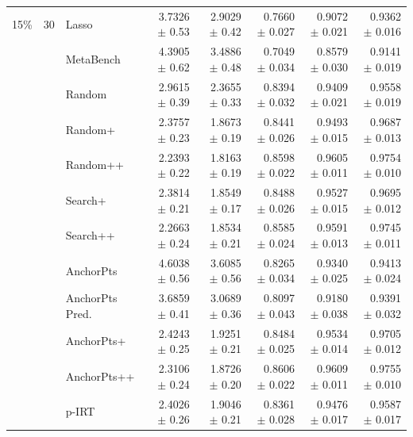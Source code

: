 \begin{longtable}{llp{}rrrrr}
\midrule
15\% & 30 & Lasso & 3.7326 {\scriptsize $\pm$ 0.53} & 2.9029 {\scriptsize $\pm$ 0.42} & 0.7660 {\scriptsize $\pm$ 0.027} & 0.9072 {\scriptsize $\pm$ 0.021} & 0.9362 {\scriptsize $\pm$ 0.016} \\
 &  & MetaBench & 4.3905 {\scriptsize $\pm$ 0.62} & 3.4886 {\scriptsize $\pm$ 0.48} & 0.7049 {\scriptsize $\pm$ 0.034} & 0.8579 {\scriptsize $\pm$ 0.030} & 0.9141 {\scriptsize $\pm$ 0.019} \\
 &  & Random & 2.9615 {\scriptsize $\pm$ 0.39} & 2.3655 {\scriptsize $\pm$ 0.33} & 0.8394 {\scriptsize $\pm$ 0.032} & 0.9409 {\scriptsize $\pm$ 0.021} & 0.9558 {\scriptsize $\pm$ 0.019} \\
 &  & Random+ & 2.3757 {\scriptsize $\pm$ 0.23} & 1.8673 {\scriptsize $\pm$ 0.19} & 0.8441 {\scriptsize $\pm$ 0.026} & 0.9493 {\scriptsize $\pm$ 0.015} & 0.9687 {\scriptsize $\pm$ 0.013} \\
 &  & Random++ & 2.2393 {\scriptsize $\pm$ 0.22} & 1.8163 {\scriptsize $\pm$ 0.19} & 0.8598 {\scriptsize $\pm$ 0.022} & 0.9605 {\scriptsize $\pm$ 0.011} & 0.9754 {\scriptsize $\pm$ 0.010} \\
 &  & Search+ & 2.3814 {\scriptsize $\pm$ 0.21} & 1.8549 {\scriptsize $\pm$ 0.17} & 0.8488 {\scriptsize $\pm$ 0.026} & 0.9527 {\scriptsize $\pm$ 0.015} & 0.9695 {\scriptsize $\pm$ 0.012} \\
 &  & Search++ & 2.2663 {\scriptsize $\pm$ 0.24} & 1.8534 {\scriptsize $\pm$ 0.21} & 0.8585 {\scriptsize $\pm$ 0.024} & 0.9591 {\scriptsize $\pm$ 0.013} & 0.9745 {\scriptsize $\pm$ 0.011} \\
 &  & AnchorPts & 4.6038 {\scriptsize $\pm$ 0.56} & 3.6085 {\scriptsize $\pm$ 0.56} & 0.8265 {\scriptsize $\pm$ 0.034} & 0.9340 {\scriptsize $\pm$ 0.025} & 0.9413 {\scriptsize $\pm$ 0.024} \\
 &  & AnchorPts Pred. & 3.6859 {\scriptsize $\pm$ 0.41} & 3.0689 {\scriptsize $\pm$ 0.36} & 0.8097 {\scriptsize $\pm$ 0.043} & 0.9180 {\scriptsize $\pm$ 0.038} & 0.9391 {\scriptsize $\pm$ 0.032} \\
 &  & AnchorPts+ & 2.4243 {\scriptsize $\pm$ 0.25} & 1.9251 {\scriptsize $\pm$ 0.21} & 0.8484 {\scriptsize $\pm$ 0.025} & 0.9534 {\scriptsize $\pm$ 0.014} & 0.9705 {\scriptsize $\pm$ 0.012} \\
 &  & AnchorPts++ & 2.3106 {\scriptsize $\pm$ 0.24} & 1.8726 {\scriptsize $\pm$ 0.20} & 0.8606 {\scriptsize $\pm$ 0.022} & 0.9609 {\scriptsize $\pm$ 0.011} & 0.9755 {\scriptsize $\pm$ 0.010} \\
 &  & p-IRT & 2.4026 {\scriptsize $\pm$ 0.26} & 1.9046 {\scriptsize $\pm$ 0.21} & 0.8361 {\scriptsize $\pm$ 0.028} & 0.9476 {\scriptsize $\pm$ 0.017} & 0.9587 {\scriptsize $\pm$ 0.017} \\

\end{longtable}
